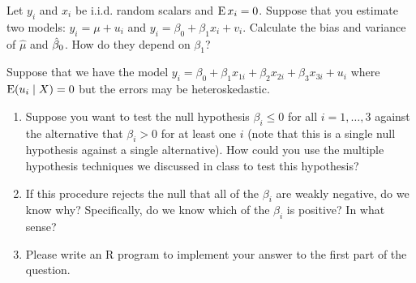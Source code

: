 \begin{hw}
  Let $y_i$ and $x_i$ be i.i.d. random scalars and $\operatorname{E} x_i = 0$.
  Suppose that you estimate two models: $y_i = \mu + u_i$ and $y_i =
  \beta_0 + \beta_1 x_i + v_i.$ Calculate the bias and variance of
  $\hat \mu$ and $\hat{\beta}_0$. How do they depend on $\beta_1$?
\end{hw}

\begin{hw}
  Suppose that we have the model $y_i = \beta_0 + \beta_1 x_{1i} +
  \beta_2 x_{2i} + \beta_3 x_{3i} + u_i$ where $\operatorname{E}(u_i \mid X) = 0$
  but the errors may be heteroskedastic.

  \begin{enumerate}
  \item Suppose you want to test the null hypothesis $\beta_i \leq 0$
    for all $i = 1,\dots,3$ against the alternative that $\beta_i > 0$
    for at least one $i$ (note that this is a single null hypothesis
    against a single alternative). How could you use the multiple
    hypothesis techniques we discussed in class to test this
    hypothesis?
  \item If this procedure rejects the null that all of the $\beta_i$
    are weakly negative, do we know why? Specifically, do we know
    which of the $\beta_i$ is positive? In what sense?
  \item Please write an R program to implement your answer to the
    first part of the question.
  \end{enumerate}
\end{hw}

